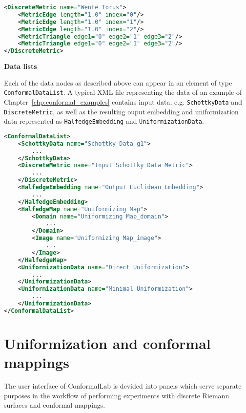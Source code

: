 \documentclass[Thesis.tex]{subfiles}
\begin{document}
\begin{lstlisting}[label=lst:discretemetric_xml, caption={A wente torus given by a discrete metric. Vertices are given implictly
by following the order of triangle glueings.}, numbers=none, language=XML, captionpos=b]
<DiscreteMetric name="Wente Torus">
	<MetricEdge length="1.0" index="0"/>
	<MetricEdge length="1.0" index="1"/>
	<MetricEdge length="1.0" index="2"/>
	<MetricTriangle edge1="0" edge2="1" edge3="2"/>
	<MetricTriangle edge1="0" edge2="1" edge3="2"/>
</DiscreteMetric>
\end{lstlisting}

{\bf Data lists}

Each of the data nodes as described above can appear in an element of type {\tt ConformalDataList}. A typical 
XML file representing the data of an example of Chapter~\ref{chp:conformal_examples} contains input
data, e.g. {\tt SchottkyData} and {\tt DiscreteMetric}, as well as the resulting ouput embedding and uniformization data represented as {\tt HalfedgeEmbedding} and {\tt UniformizationData}.

\begin{lstlisting}[label=lst:datalist_xml, caption={A list of data XML nodes as the result of an algorithm calculating the Fuchsian uniformization of a genus $1$ Riemann surface given by Schottky data.}, numbers=none, language=XML, captionpos=b]
<ConformalDataList>
	<SchottkyData name="Schottky Data g1">
		...
	</SchottkyData>
	<DiscreteMetric name="Input Schottky Data Metric">
		...
	</DiscreteMetric>
	<HalfedgeEmbedding name="Output Euclidean Embedding">
		...
	</HalfedgeEmbedding>
	<HalfedgeMap name="Uniformizing Map">
		<Domain name="Uniformizing Map_domain">
			...
		</Domain>
		<Image name="Uniformizing Map_image">
			...
		</Image>
	</HalfedgeMap>
	<UniformizationData name="Direct Uniformization">
		...
	</UniformizationData>
	<UniformizationData name="Minimal Uniformization">
		...
	</UniformizationData>
</ConformalDataList>
\end{lstlisting}

\section{Uniformization and conformal mappings}
\label{sec:conformallab_ui}

The user interface of {\sc ConformalLab} is devided into panels which serve separate purposes in the 
workflow of performing experiments with discrete Riemann surfaces and conformal mappings.
\end{document}
